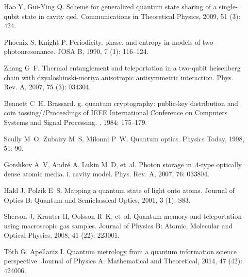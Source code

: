 \begin{thebibliography}{113}
	Hao Y, Gui-Ying Q.
	\newblock Scheme for generalized quantum state sharing of a single-qubit state
	in cavity qed\allowbreak[J].
	\newblock Communications in Theoretical Physics, 2009, 51 (3): 424.
	
	Phoenix S, Knight P.
	\newblock Periodicity, phase, and entropy in models of
	two-photonresonance\allowbreak[J].
	\newblock JOSA B, 1990, 7 (1): 116--124.
	
	Zhang G~F.
	\newblock Thermal entanglement and teleportation in a two-qubit heisenberg
	chain with dzyaloshinski-moriya anisotropic antisymmetric
	interaction\allowbreak[J].
	\newblock Phys. Rev. A, 2007, 75 (3): 034304.
	
	Bennett C~H.
	\newblock Brassard. g. quantum cryptography: public-key distribution and coin
	tossing\allowbreak[C]//\allowbreak{}Proceedings of IEEE International
	Conference on Computers Systems and Signal Processing.
	\newblock [Z], 1984: 175--179.
	
	Scully M~O, Zubairy M~S, Milonni P~W.
	\newblock Quantum optics\allowbreak[J].
	\newblock Physics Today, 1998, 51: 90.
	
	Gorshkov A~V, Andr\'e A, Lukin M~D, et~al.
	\newblock Photon storage in $\ensuremath{\Lambda}$-type optically dense atomic
	media. i. cavity model\allowbreak[J].
	\newblock Phys. Rev. A, 2007, 76: 033804.
	
	Hald J, Polzik E~S.
	\newblock Mapping a quantum state of light onto atoms\allowbreak[J].
	\newblock Journal of Optics B: Quantum and Semiclassical Optics, 2001,
	3 (1): S83.
	
	Sherson J, Krauter H, Oolsson R~K, et~al.
	\newblock Quantum memory and teleportation using macroscopic gas
	samples\allowbreak[J].
	\newblock Journal of Physics B: Atomic, Molecular and Optical Physics, 2008,
	41 (22): 223001.
	
	T\'oth G, Apellaniz I.
	\newblock Quantum metrology from a quantum information science
	perspective\allowbreak[J].
	\newblock Journal of Physics A: Mathematical and Theoretical, 2014, 47
	(42): 424006.
	

\end{thebibliography}
